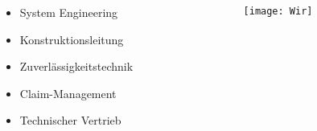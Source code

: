 \documentclass[slidestop,compress,mathserif, aspectratio = 169]{beamer}
\begin{document}
{\begin{columns}[t]
\begin{column}[T]{7cm}
\begin{itemize}
{\begin{itemize}
\begin{itemize}
		\item System Engineering
		\item Konstruktionsleitung
		\item Zuverl\"assigkeitstechnik
		\item Claim-Management
		\item Technischer Vertrieb
		\end{itemize}
		\end{itemize}}
     	\end{itemize}
     \end{column}
     	\begin{column}[T]{7cm} 
         	\begin{center}
			\vspace{-.7cm}
            		\texttt{[image: Wir]}\source{}
        		\end{center}
     \end{column}
 \end{columns}
}


%
%
%
%
\end{document}
